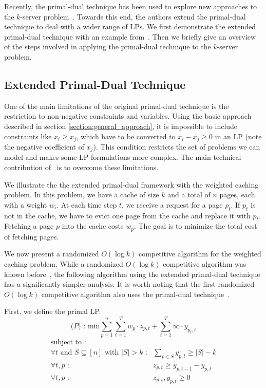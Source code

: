 Recently, the primal-dual technique has been used to explore new approaches to the $k$-server problem~\cite{bansal10:k-server}.
Towards this end, the authors extend the primal-dual technique to deal with a wider range of LPs.
We first demonstrate the extended primal-dual technique with an example from~\cite{bansal10:k-server}.
Then we briefly give an overview of the steps involved in applying the primal-dual technique to the $k$-server problem.

\subsection{Extended Primal-Dual Technique}
One of the main limitations of the original primal-dual technique is the restriction to non-negative constraints and variables.
Using the basic approach described in section \ref{section:general_approach}, it is impossible to include constraints like $x_i \geq x_j$, which have to be converted to $x_i - x_j \geq 0$ in an LP (note the negative coefficient of $x_j$).
This condition restricts the set of problems we can model and makes some LP formulations more complex.
The main technical contribution of~\cite{bansal10:k-server} is to overcome these limitations.

We illustrate the the extended primal-dual framework with the weighted caching problem.
In this problem, we have a cache of size $k$ and a total of $n$ pages, each with a weight $w_i$.
At each time step $t$, we receive a request for a page $p_t$.
If $p_t$ is not in the cache, we have to evict one page from the cache and replace it with $p_t$.
Fetching a page $p$ into the cache costs $w_p$.
The goal is to minimize the total cost of fetching pages.

We now present a randomized $O(\log k)$ competitive algorithm for the weighted caching problem.
While a randomized $O(\log k)$ competitive algorithm was known before~\cite{bansal10:k-server}, the following algorithm using the extended primal-dual technique has a significantly simpler analysis.
It is worth noting that the first randomized $O(\log k)$ competitive algorithm also uses the primal-dual technique~\cite{bansal07:weighted-paging}.

First, we define the primal LP.
\[
\textrm{($P$) : min}  \sum_{p=1}^n\sum_{t=1}^T w_p \cdot z_{p,t} + \sum_{t=1}^T \infty \cdot y_{p_t,t}
\]
\[
	\begin{array}{rr}
	\textrm{subject to :} & \\
		\forall t \textrm{ and } S \subseteq [n] \textrm{ with }|S| > k \textrm{ :} & \sum_{p\in S} y_{p,t} \geq |S| - k \\
		\forall t,p \textrm{ :} & z_{p,t} \geq y_{p,t-1} - y_{p,t} \\
		\forall t,p \textrm{ :} & z_{p,t}, y_{p,t} \geq 0 \\
	\end{array}
\]

